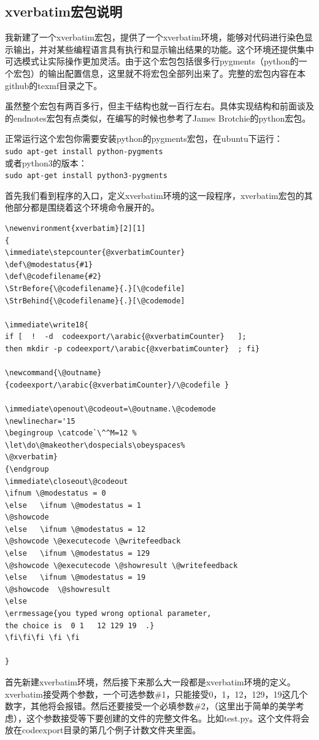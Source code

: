 \documentclass[11pt,oneside]{book}
\begin{document}
\begin{common-format}
\subsection{xverbatim宏包说明}
我新建了一个xverbatim宏包，提供了一个xverbatim环境，能够对代码进行染色显示输出，并对某些编程语言具有执行和显示输出结果的功能。这个环境还提供集中可选模式让实际操作更加灵活。由于这个宏包包括很多行pygments（python的一个宏包）的输出配置信息，这里就不将宏包全部列出来了。完整的宏包内容在本github的texmf目录之下。

虽然整个宏包有两百多行，但主干结构也就一百行左右。具体实现结构和前面谈及的endnotes宏包有点类似，在编写的时候也参考了James Brotchie的python宏包。

正常运行这个宏包你需要安装python的pygments宏包，在ubuntu下运行：\\
\verb+sudo apt-get install python-pygments+\\
或者python3的版本：\\
\verb+sudo apt-get install python3-pygments+

首先我们看到程序的入口，定义xverbatim环境的这一段程序，xverbatim宏包的其他部分都是围绕着这个环境命令展开的。
\begin{Verbatim}
\newenvironment{xverbatim}[2][1]
{
\immediate\stepcounter{@xverbatimCounter}
\def\@modestatus{#1}
\def\@codefilename{#2}
\StrBefore{\@codefilename}{.}[\@codefile]
\StrBehind{\@codefilename}{.}[\@codemode]

\immediate\write18{
if [  !  -d  codeexport/\arabic{@xverbatimCounter}   ];
then mkdir -p codeexport/\arabic{@xverbatimCounter}  ; fi}

\newcommand{\@outname}
{codeexport/\arabic{@xverbatimCounter}/\@codefile }

\immediate\openout\@codeout=\@outname.\@codemode
\newlinechar='15
\begingroup \catcode`\^^M=12 %
\let\do\@makeother\dospecials\obeyspaces%
\@xverbatim}
{\endgroup
\immediate\closeout\@codeout
\ifnum \@modestatus = 0
\else   \ifnum \@modestatus = 1    
\@showcode
\else   \ifnum \@modestatus = 12   
\@showcode \@executecode \@writefeedback
\else   \ifnum \@modestatus = 129   
\@showcode \@executecode \@showresult \@writefeedback
\else   \ifnum \@modestatus = 19  
\@showcode  \@showresult
\else    
\errmessage{you typed wrong optional parameter,
the choice is  0 1   12 129 19  .}
\fi\fi\fi \fi \fi

}
\end{Verbatim}
首先新建xverbatim环境，然后接下来那么大一段都是xverbatim环境的定义。xverbatim接受两个参数，一个可选参数\#{}1，只能接受0，1，12，129，19这几个数字，其他将会报错。然后还要接受一个必填参数\#{}2，（这里出于简单的美学考虑），这个参数接受等下要创建的文件的完整文件名。比如test.py。这个文件将会放在codeexport目录的第几个例子计数文件夹里面。


\end{common-format}
\end{document}
